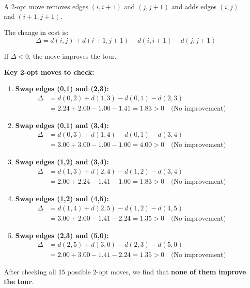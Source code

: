 \documentclass[12pt,a4paper]{article}
\begin{document}
A 2-opt move removes edges $(i, i+1)$ and $(j, j+1)$ and adds edges $(i, j)$ and $(i+1, j+1)$.

The change in cost is:
\[
\Delta = d(i,j) + d(i+1,j+1) - d(i,i+1) - d(j,j+1)
\]

If $\Delta < 0$, the move improves the tour.

\textbf{Key 2-opt moves to check:}

\begin{enumerate}
    \item \textbf{Swap edges (0,1) and (2,3):}
    \begin{align*}
    \Delta &= d(0,2) + d(1,3) - d(0,1) - d(2,3) \\
    &= 2.24 + 2.00 - 1.00 - 1.41 = 1.83 > 0 \quad \text{(No improvement)}
    \end{align*}
    
    \item \textbf{Swap edges (0,1) and (3,4):}
    \begin{align*}
    \Delta &= d(0,3) + d(1,4) - d(0,1) - d(3,4) \\
    &= 3.00 + 3.00 - 1.00 - 1.00 = 4.00 > 0 \quad \text{(No improvement)}
    \end{align*}
    
    \item \textbf{Swap edges (1,2) and (3,4):}
    \begin{align*}
    \Delta &= d(1,3) + d(2,4) - d(1,2) - d(3,4) \\
    &= 2.00 + 2.24 - 1.41 - 1.00 = 1.83 > 0 \quad \text{(No improvement)}
    \end{align*}
    
    \item \textbf{Swap edges (1,2) and (4,5):}
    \begin{align*}
    \Delta &= d(1,4) + d(2,5) - d(1,2) - d(4,5) \\
    &= 3.00 + 2.00 - 1.41 - 2.24 = 1.35 > 0 \quad \text{(No improvement)}
    \end{align*}
    
    \item \textbf{Swap edges (2,3) and (5,0):}
    \begin{align*}
    \Delta &= d(2,5) + d(3,0) - d(2,3) - d(5,0) \\
    &= 2.00 + 3.00 - 1.41 - 2.24 = 1.35 > 0 \quad \text{(No improvement)}
    \end{align*}
\end{enumerate}

After checking all 15 possible 2-opt moves, we find that \textbf{none of them improve the tour}.
\end{document}
